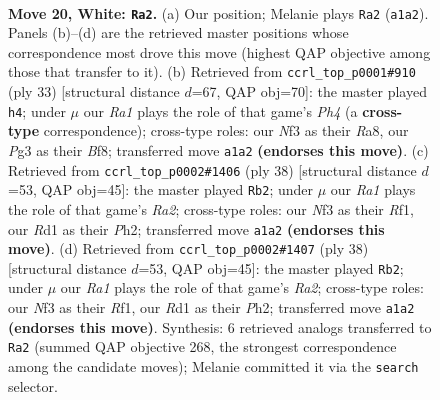 \documentclass[11pt]{article}
\begin{document}
\clearpage

\begin{figure}[p]\centering
\begin{subfigure}{0.46\textwidth}\centering
\resizebox{\linewidth}{!}{%
\newchessgame
\chessboard[
  setfen={r1b1kbr1/2p5/1pn3p1/p4p1p/3P4/1PPB1NP1/5P1P/R1BR2K1 w q - 10 20},
  showmover=false,
  pgfstyle=straightmove, color=movearrow, markmove={a1-a2}
]}
\caption{}
\end{subfigure}\hfill
\begin{subfigure}{0.46\textwidth}\centering
\resizebox{\linewidth}{!}{%
\newchessgame
\chessboard[
  setfen={r3kb1r/1p3pp1/p3pn2/4Nb1p/2BB4/2P2P1P/PP4P1/R3K2R b KQkq - 2 17},
  showmover=false,
  pgfstyle=straightmove, color=movearrow, markmove={h5-h4}
]}
\caption{}
\end{subfigure}
\\[4pt]
\begin{subfigure}{0.46\textwidth}\centering
\resizebox{\linewidth}{!}{%
\newchessgame
\chessboard[
  setfen={r1b1k2r/pp3ppp/2p1p3/1P4B1/1b1P4/4PN2/R1B1nPPP/5R1K w kq - 3 20},
  showmover=false,
  pgfstyle=straightmove, color=movearrow, markmove={a2-b2}
]}
\caption{}
\end{subfigure}\hfill
\begin{subfigure}{0.46\textwidth}\centering
\resizebox{\linewidth}{!}{%
\newchessgame
\chessboard[
  setfen={r1b1k2r/pp3ppp/2p1p3/1P4B1/1b1P4/4PN2/R1B1nPPP/5R1K w kq - 3 20},
  showmover=false,
  pgfstyle=straightmove, color=movearrow, markmove={a2-b2}
]}
\caption{}
\end{subfigure}
\caption{\textbf{Move 20, White: \texttt{Ra2}.} (a) Our position; Melanie plays \texttt{Ra2} (\texttt{a1a2}). Panels (b)--(d) are the retrieved master positions whose correspondence most drove this move (highest QAP objective among those that transfer to it). (b) Retrieved from \texttt{ccrl\_top\_p0001\#910} (ply 33) [structural distance $d$=67, QAP obj=70]: the master played \texttt{h4}; under $\mu$ our \emph{Ra1} plays the role of that game's \emph{Ph4} (a \textbf{cross-type} correspondence); cross-type roles: our \emph{N}f3 as their \emph{R}a8, our \emph{P}g3 as their \emph{B}f8; transferred move \texttt{a1a2} \textbf{(endorses this move)}. (c) Retrieved from \texttt{ccrl\_top\_p0002\#1406} (ply 38) [structural distance $d$=53, QAP obj=45]: the master played \texttt{Rb2}; under $\mu$ our \emph{Ra1} plays the role of that game's \emph{Ra2}; cross-type roles: our \emph{N}f3 as their \emph{R}f1, our \emph{R}d1 as their \emph{P}h2; transferred move \texttt{a1a2} \textbf{(endorses this move)}. (d) Retrieved from \texttt{ccrl\_top\_p0002\#1407} (ply 38) [structural distance $d$=53, QAP obj=45]: the master played \texttt{Rb2}; under $\mu$ our \emph{Ra1} plays the role of that game's \emph{Ra2}; cross-type roles: our \emph{N}f3 as their \emph{R}f1, our \emph{R}d1 as their \emph{P}h2; transferred move \texttt{a1a2} \textbf{(endorses this move)}. Synthesis: 6 retrieved analogs transferred to \texttt{Ra2} (summed QAP objective 268, the strongest correspondence among the candidate moves); Melanie committed it via the \texttt{search} selector.}
\label{fig:thought-m38}
\end{figure}
\end{document}
